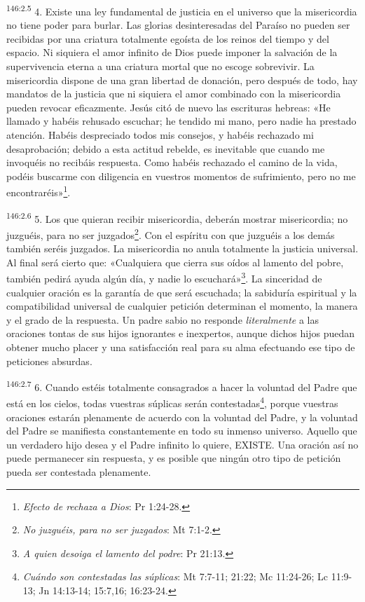 \par 
\textsuperscript{146:2.5} 4. Existe una ley fundamental de justicia en el universo que la misericordia no tiene poder para burlar. Las glorias desinteresadas del Paraíso no pueden ser recibidas por una criatura totalmente egoísta de los reinos del tiempo y del espacio. Ni siquiera el amor infinito de Dios puede imponer la salvación de la supervivencia eterna a una criatura mortal que no escoge sobrevivir. La misericordia dispone de una gran libertad de donación, pero después de todo, hay mandatos de la justicia que ni siquiera el amor combinado con la misericordia pueden revocar eficazmente. Jesús citó de nuevo las escrituras hebreas: «He llamado y habéis rehusado escuchar; he tendido mi mano, pero nadie ha prestado atención. Habéis despreciado todos mis consejos, y habéis rechazado mi desaprobación; debido a esta actitud rebelde, es inevitable que cuando me invoquéis no recibáis respuesta. Como habéis rechazado el camino de la vida, podéis buscarme con diligencia en vuestros momentos de sufrimiento, pero no me encontraréis»\footnote{\textit{Efecto de rechaza a Dios}: Pr 1:24-28.}.

\par 
\textsuperscript{146:2.6} 5. Los que quieran recibir misericordia, deberán mostrar misericordia; no juzguéis, para no ser juzgados\footnote{\textit{No juzguéis, para no ser juzgados}: Mt 7:1-2.}. Con el espíritu con que juzguéis a los demás también seréis juzgados. La misericordia no anula totalmente la justicia universal. Al final será cierto que: «Cualquiera que cierra sus oídos al lamento del pobre, también pedirá ayuda algún día, y nadie lo escuchará»\footnote{\textit{A quien desoiga el lamento del podre}: Pr 21:13.}. La sinceridad de cualquier oración es la garantía de que será escuchada; la sabiduría espiritual y la compatibilidad universal de cualquier petición determinan el momento, la manera y el grado de la respuesta. Un padre sabio no responde \textit{literalmente} a las oraciones tontas de sus hijos ignorantes e inexpertos, aunque dichos hijos puedan obtener mucho placer y una satisfacción real para su alma efectuando ese tipo de peticiones absurdas.

\par 
\textsuperscript{146:2.7} 6. Cuando estéis totalmente consagrados a hacer la voluntad del Padre que está en los cielos, todas vuestras súplicas serán contestadas\footnote{\textit{Cuándo son contestadas las súplicas}: Mt 7:7-11; 21:22; Mc 11:24-26; Lc 11:9-13; Jn 14:13-14; 15:7,16; 16:23-24.}, porque vuestras oraciones estarán plenamente de acuerdo con la voluntad del Padre, y la voluntad del Padre se manifiesta constantemente en todo su inmenso universo. Aquello que un verdadero hijo desea y el Padre infinito lo quiere, EXISTE. Una oración así no puede permanecer sin respuesta, y es posible que ningún otro tipo de petición pueda ser contestada plenamente.


